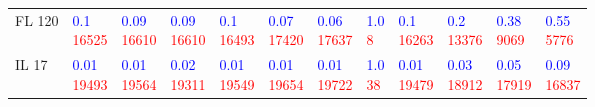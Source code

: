 \begin{tabular}{llllllllllll}
FL 120 &   \makecell{\textcolor{blue}{0.1} \\ \textcolor{red}{16525}} &  \makecell{\textcolor{blue}{0.09} \\ \textcolor{red}{16610}} &  \makecell{\textcolor{blue}{0.09} \\ \textcolor{red}{16610}} &   \makecell{\textcolor{blue}{0.1} \\ \textcolor{red}{16493}} &  \makecell{\textcolor{blue}{0.07} \\ \textcolor{red}{17420}} &  \makecell{\textcolor{blue}{0.06} \\ \textcolor{red}{17637}} &     \makecell{\textcolor{blue}{1.0} \\ \textcolor{red}{8}} &   \makecell{\textcolor{blue}{0.1} \\ \textcolor{red}{16263}} &   \makecell{\textcolor{blue}{0.2} \\ \textcolor{red}{13376}} &   \makecell{\textcolor{blue}{0.38} \\ \textcolor{red}{9069}} &   \makecell{\textcolor{blue}{0.55} \\ \textcolor{red}{5776}} \\
IL 17  &  \makecell{\textcolor{blue}{0.01} \\ \textcolor{red}{19493}} &  \makecell{\textcolor{blue}{0.01} \\ \textcolor{red}{19564}} &  \makecell{\textcolor{blue}{0.02} \\ \textcolor{red}{19311}} &  \makecell{\textcolor{blue}{0.01} \\ \textcolor{red}{19549}} &  \makecell{\textcolor{blue}{0.01} \\ \textcolor{red}{19654}} &  \makecell{\textcolor{blue}{0.01} \\ \textcolor{red}{19722}} &    \makecell{\textcolor{blue}{1.0} \\ \textcolor{red}{38}} &  \makecell{\textcolor{blue}{0.01} \\ \textcolor{red}{19479}} &  \makecell{\textcolor{blue}{0.03} \\ \textcolor{red}{18912}} &  \makecell{\textcolor{blue}{0.05} \\ \textcolor{red}{17919}} &  \makecell{\textcolor{blue}{0.09} \\ \textcolor{red}{16837}} \\

\end{tabular}
